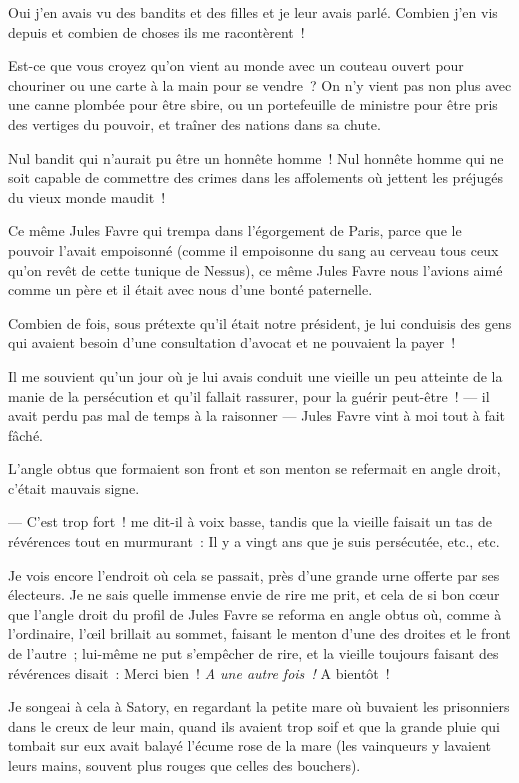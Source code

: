 \documentclass[french,twoside]{book} %
\begin{document}
 \noindent Oui j’en avais vu des bandits et des filles et je leur avais parlé. Combien j’en vis depuis et combien de choses ils me racontèrent !\par
Est-ce que vous croyez qu’on vient au monde avec un couteau ouvert pour chouriner ou une carte à la main pour se vendre ? On n’y vient pas non plus avec une canne plombée pour être sbire, ou un portefeuille de ministre pour être pris des vertiges du pouvoir, et traîner des nations dans sa chute.\par
Nul bandit qui n’aurait pu être un honnête homme ! Nul honnête homme qui ne soit capable de commettre des crimes dans les affolements où jettent les préjugés du vieux monde maudit !\par
Ce même Jules Favre qui trempa dans l’égorgement de Paris, parce que le pouvoir l’avait empoisonné (comme il empoisonne du sang au cerveau tous ceux qu’on revêt de cette tunique de Nessus), ce même Jules Favre nous l’avions aimé comme un père et il était avec nous d’une bonté paternelle.\par
Combien de fois, sous prétexte qu’il était notre président, je lui conduisis des gens qui avaient besoin d’une consultation d’avocat et ne pouvaient la payer !\par
Il me souvient qu’un jour où je lui avais conduit  une vieille un peu atteinte de la manie de la persécution et qu’il fallait rassurer, pour la guérir peut-être ! — il avait perdu pas mal de temps à la raisonner — Jules Favre vint à moi tout à fait fâché.\par
L’angle obtus que formaient son front et son menton se refermait en angle droit, c’était mauvais signe.\par
— C’est trop fort ! me dit-il à voix basse, tandis que la vieille faisait un tas de révérences tout en murmurant : Il y a vingt ans que je suis persécutée, etc., etc.\par
Je vois encore l’endroit où cela se passait, près d’une grande urne offerte par ses électeurs. Je ne sais quelle immense envie de rire me prit, et cela de si bon cœur que l’angle droit du profil de Jules Favre se reforma en angle obtus où, comme à l’ordinaire, l’œil brillait au sommet, faisant le menton d’une des droites et le front de l’autre ; lui-même ne put s’empêcher de rire, et la vieille toujours faisant des révérences disait : Merci bien ! \emph{A une autre fois !} A bientôt !\par
Je songeai à cela à Satory, en regardant la petite mare où buvaient les prisonniers dans le creux de leur main, quand ils avaient trop soif et que la grande pluie qui tombait sur eux avait balayé l’écume rose de la mare (les vainqueurs y  lavaient leurs mains, souvent plus rouges que celles des bouchers).\par
\end{document}
